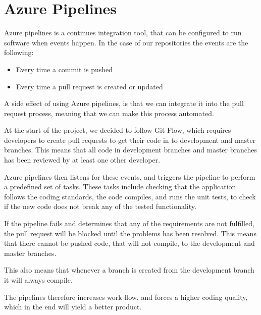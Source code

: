\section{Azure Pipelines}\label{sec:AzurePipelines}
\label{azurepipelines}
Azure pipelines is a continues integration tool, that can be configured to run software when events happen.
In the case of our repositories the events are the following:
\begin{itemize}
    \item Every time a commit is pushed
    \item Every time a pull request is created or updated
\end{itemize}

A side effect of using Azure pipelines, is that we can integrate it into the pull request process, meaning that we can make this process automated. 

At the start of the project, we decided to follow Git Flow, which requires developers to create pull requests to get their code in to development and master branches.
This means that all code in development branches and master branches has been reviewed by at least one other developer.

Azure pipelines then listens for these events, and triggers the pipeline to perform a predefined set of tasks.
These tasks include checking that the application follows the coding standards, the code compiles, and runs the unit tests, to check if the new code does not break any of the tested functionality. 

If the pipeline fails and determines that any of the requirements are not fulfilled, the pull request will be blocked until the problems has been resolved.
This means that there cannot be pushed code, that will not compile, to the development and master branches.

This also means that whenever a branch is created from the development branch it will always compile.

The pipelines therefore increases work flow, and forces a higher coding quality, which in the end will yield a better product.





